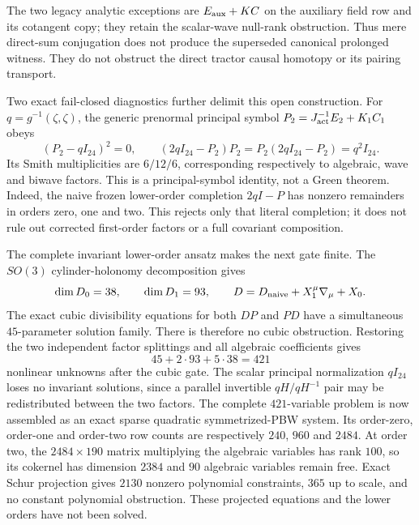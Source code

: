 \documentclass[11pt]{article}
\theoremstyle{definition}
\theoremstyle{remark}
\begin{document}
The two legacy analytic exceptions
are $E_{\rm aux}+KC$ on the auxiliary field row and its cotangent copy; they
retain the scalar-wave null-rank obstruction.  Thus mere direct-sum
conjugation does not produce the superseded canonical prolonged witness.
They do not obstruct the direct tractor causal homotopy or its pairing
transport.

Two exact fail-closed diagnostics further delimit this open construction.
For $q=g^{-1}(\zeta,\zeta)$, the generic prenormal principal symbol
$P_2=J_{\rm act}^{-1}E_2+K_1C_1$ obeys
\begin{equation}\label{eq:prenormal-minimal-polynomial}
 (P_2-qI_{24})^2=0,
 \qquad
 (2qI_{24}-P_2)P_2=P_2(2qI_{24}-P_2)=q^2I_{24}.
\end{equation}
Its Smith multiplicities are $6/12/6$, corresponding respectively to
algebraic, wave and biwave factors.  This is a principal-symbol identity, not
a Green theorem.  Indeed, the naive frozen lower-order completion
$2qI-P$ has nonzero remainders in orders zero, one and two.  This rejects only
that literal completion; it does not rule out corrected first-order factors
or a full covariant composition.

The complete invariant lower-order ansatz makes the next gate finite.  The
$SO(3)$ cylinder-holonomy decomposition gives
\begin{equation}\label{eq:lower-factor-ansatz-dimensions}
 \dim D_0=38,
 \qquad
 \dim D_1=93,
 \qquad
 D=D_{\rm naive}+X_1^\mu\nabla_\mu+X_0.
\end{equation}
The exact cubic divisibility equations for both $DP$ and $PD$ have a
simultaneous $45$-parameter solution family.  There is therefore no cubic
obstruction.  Restoring the two independent factor splittings and all
algebraic coefficients gives
\begin{equation}\label{eq:lower-factor-full-variable-count}
 45+2\cdot93+5\cdot38=421
\end{equation}
nonlinear unknowns after the cubic gate.  The scalar principal normalization
$qI_{24}$ loses no invariant solutions, since a parallel invertible
$qH/qH^{-1}$ pair may be redistributed between the two factors.
The complete $421$-variable problem is now assembled as an exact sparse
quadratic symmetrized-PBW system.  Its order-zero, order-one and order-two
row counts are respectively $240$, $960$ and $2484$.  At order two, the
$2484\times190$ matrix multiplying the algebraic variables has rank $100$,
so its cokernel has dimension $2384$ and $90$ algebraic variables remain
free.  Exact Schur projection gives $2130$ nonzero polynomial constraints,
$365$ up to scale, and no constant polynomial obstruction.  These projected
equations and the lower orders have not been solved.
\end{document}
